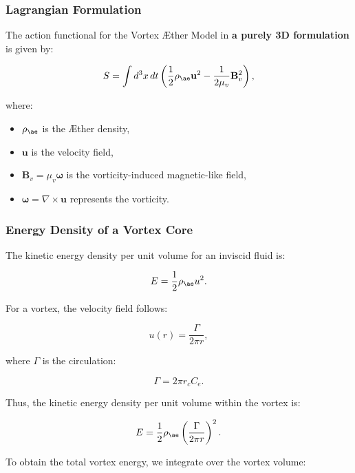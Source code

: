 \subsubsection*{Lagrangian Formulation}
The action functional for the Vortex Æther Model in \textbf{a purely 3D formulation} is given by:

\begin{equation*}
    S = \int d^3x \, dt \left( \frac{1}{2} \rho_{\ae} \mathbf{u}^2 - \frac{1}{2 \mu_v} \mathbf{B}_v^2 \right),
\end{equation*}

where:
\begin{itemize}
    \item \( \rho_{\ae} \) is the Æther density,
    \item \( \mathbf{u} \) is the velocity field,
    \item \( \mathbf{B}_v = \mu_v \boldsymbol{\omega} \) is the vorticity-induced magnetic-like field,
    \item \( \boldsymbol{\omega} = \nabla \times \mathbf{u} \) represents the vorticity.
\end{itemize}

\subsubsection*{Energy Density of a Vortex Core}
The kinetic energy density per unit volume for an inviscid fluid is:

\begin{equation*}
    E = \frac{1}{2} \rho_{\ae} u^2.
\end{equation*}

For a vortex, the velocity field follows:

\begin{equation*}
    u(r) = \frac{\Gamma}{2\pi r},
\end{equation*}

where \( \Gamma \) is the circulation:

\begin{equation*}
    \Gamma = 2\pi r_c C_e.
\end{equation*}

Thus, the kinetic energy density per unit volume within the vortex is:

\begin{equation*}
    E = \frac{1}{2} \rho_{\ae} \left( \frac{\Gamma}{2\pi r} \right)^2.
\end{equation*}

To obtain the total vortex energy, we integrate over the vortex volume:

